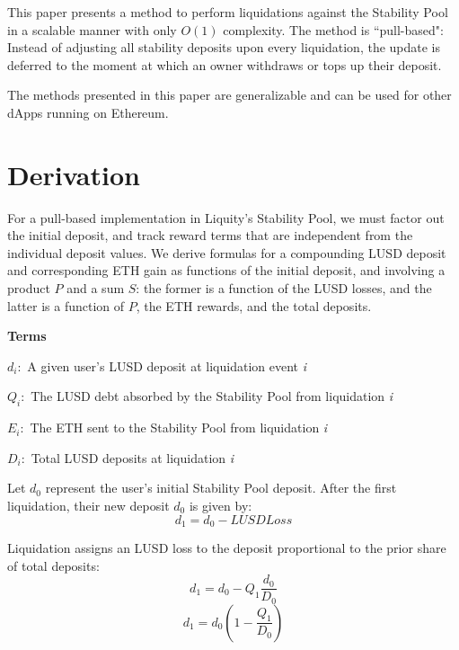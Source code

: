 \documentclass[reqno]{article}
\begin{document}
This paper presents a method to perform liquidations against the Stability Pool in a scalable manner with only $O(1)$ complexity. The method is ``pull-based": Instead of adjusting all stability deposits upon every liquidation, the update is deferred to the moment at which an owner withdraws or tops up their deposit.

The methods presented in this paper are generalizable and can be used for other dApps running on Ethereum.

\section{Derivation}
For a pull-based implementation in Liquity’s Stability Pool, we must factor out the initial deposit, and track reward terms that are independent from the individual deposit values. We derive formulas for a compounding LUSD deposit and corresponding ETH gain as functions of the initial deposit, and involving a product $P$ and a sum $S$: the former is a function of the LUSD losses, and the latter is a function of $P$, the ETH rewards, and the total deposits.

\bigskip
\raggedright %

\textbf{Terms}
\begin{terms}
    \item $d_i:$ A given user’s LUSD deposit at liquidation event \textit{i}\\
    \item $Q_i:$ The LUSD debt absorbed by the Stability Pool from liquidation \textit{i}\\
    \item $E_i:$ The ETH sent to the Stability Pool from liquidation \textit{i}\\
    \item $D_i:$ Total LUSD deposits at liquidation \textit{i}
\end{terms}

\bigskip
Let $d_0$ represent the user’s initial Stability Pool deposit. After the first liquidation, their new
deposit $d_0$ is given by:\\
\begin{equation} 
    d_1=d_0-LUSDLoss
\end{equation}

\bigskip
Liquidation assigns an LUSD loss to the deposit proportional to the prior share of total deposits:
\begin{equation} \label{eq:2}
    d_1=d_0-Q_1\frac{d_0}{D_0}
\end{equation}
\begin{equation} 
    d_1=d_0\left(1-\frac{Q_1}{D_0}\right)
\end{equation}
\end{document}
